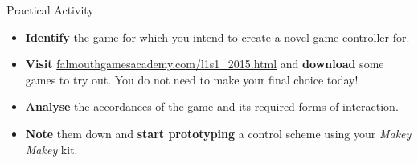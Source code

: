 \documentclass[xcolor={dvipsnames}]{beamer}\usepackage{etoolbox}\newtoggle{printable}\togglefalse{printable}
\begin{document}
\begin{frame}{Practical Activity}
	\begin{itemize}
		\item \textbf{Identify} the game for which you intend to create a novel game controller for.
		\item \textbf{Visit} \url{falmouthgamesacademy.com/l1s1_2015.html} 
		and \textbf{download} some games to try out. You do not need to make your final choice today!
		\item \textbf{Analyse} the accordances of the game and its required forms of interaction.
		\item \textbf{Note} them down and \textbf{start prototyping} a control scheme using your \textit{Makey Makey} kit.
	\end{itemize}
\end{frame}


%
\end{document}
